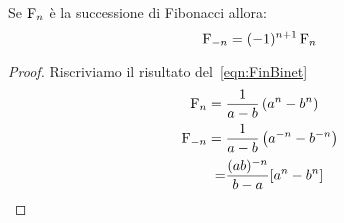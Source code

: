 \begin{thm}
Se $\operatorname{F}_{n}$ è la successione di Fibonacci allora:
\begin{equation}
	\operatorname{F}_{-n}=(-1)^{n+1}\operatorname{F}_{n}
\end{equation}\label{eqn:FibNegate}
\end{thm}\cite{Rabinowitz_1996}
\begin{proof}
	Riscriviamo il risultato del~\vref{eqn:FinBinet}
	\begin{align*}
		\operatorname{F}_{n}={}&\dfrac{1}{a-b}\left(a^n-b^n\right)\\
		\operatorname{F}_{-n}={}&\dfrac{1}{a-b}\left(a^{-n}-b^{-n}\right)\\
		=&\dfrac{(ab)^{-n}}{b-a}[a^n-b^n]
	\end{align*}
\end{proof}